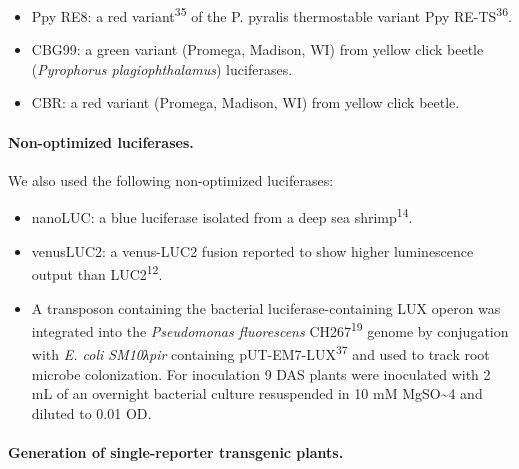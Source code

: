 \documentclass[]{article}
\begin{document}
\begin{itemize}
\item
  Ppy RE8: a red variant\textsuperscript{35} of the P. pyralis
  thermostable variant Ppy RE-TS\textsuperscript{36}.
\item
  CBG99: a green variant (Promega, Madison, WI) from yellow click beetle
  (\emph{Pyrophorus plagiophthalamus}) luciferases.
\item
  CBR: a red variant (Promega, Madison, WI) from yellow click beetle.
\end{itemize}

\paragraph{Non-optimized luciferases.}\label{non-optimized-luciferases.}

We also used the following non-optimized luciferases:

\begin{itemize}
\item
  nanoLUC: a blue luciferase isolated from a deep sea
  shrimp\textsuperscript{14}.
\item
  venusLUC2: a venus-LUC2 fusion reported to show higher luminescence
  output than LUC2\textsuperscript{12}.
\item
  A transposon containing the bacterial luciferase-containing LUX operon
  was integrated into the \emph{Pseudomonas fluorescens}
  CH267\textsuperscript{19} genome by conjugation with \emph{E. coli
  SM10λpir} containing pUT-EM7-LUX\textsuperscript{37} and used to track
  root microbe colonization. For inoculation 9 DAS plants were
  inoculated with 2 mL of an overnight bacterial culture resuspended in
  10 mM MgSO\textasciitilde{}4 and diluted to 0.01 OD.
\end{itemize}

\paragraph{Generation of single-reporter transgenic
plants.}\label{generation-of-single-reporter-transgenic-plants.}
\end{document}
